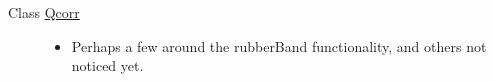 \label{bug__bug000001}
\hypertarget{bug__bug000001}{}
 \begin{description}
\item[Class \hyperlink{classQcorr}{Qcorr} ]\begin{itemize}
\item Perhaps a few around the rubberBand functionality, and others not noticed yet.\end{itemize}


\end{description}
